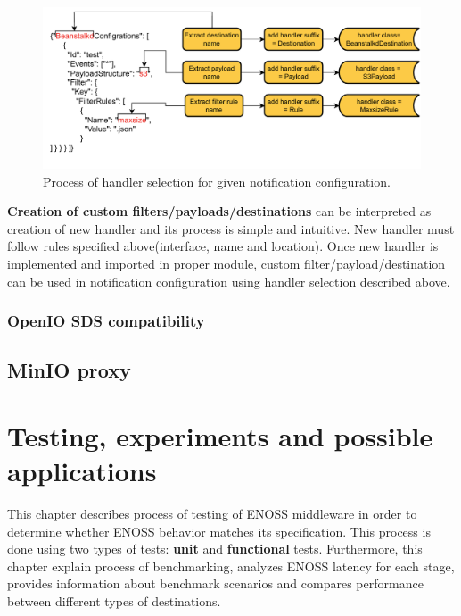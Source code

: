     \begin{figure}[H]
        \centering
        \includegraphics[width=1\textwidth]{obrazky-figures/enoss-handler-selection.pdf}
        \caption{Process of handler selection for given notification configuration.}
        \label{fig:enoss-handler-selection}
    \end{figure}

    \textbf{Creation of custom filters/payloads/destinations} can be interpreted as creation of new handler and its process is simple and intuitive. New handler must follow rules specified above(interface, name and location). Once new handler is implemented and imported in proper module, custom filter/payload/destination can be used in notification configuration using handler selection described above.

    \subsection{OpenIO SDS compatibility}
    \textcolor{gray}{\blindtext}

    \textcolor{gray}{\blindtext}

\section{MinIO proxy}
    \textcolor{gray}{\blindtext}

    \textcolor{gray}{\blindtext}

    \textcolor{gray}{\blindtext}

    \textcolor{gray}{\blindtext}


\chapter{Testing, experiments and possible applications}
    This chapter describes process of testing of ENOSS middleware in order to determine whether ENOSS behavior matches its specification. This process is done using two types of tests: \textbf{unit} and \textbf{functional} tests. Furthermore, this chapter explain process of benchmarking, analyzes ENOSS latency for each stage, provides information about benchmark scenarios and compares performance between different types of destinations.

